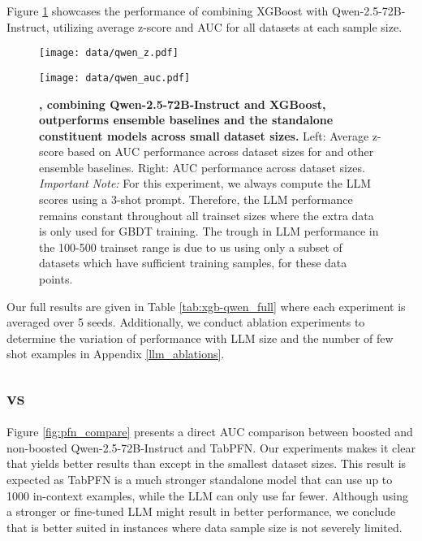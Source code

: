 Figure \ref{fig:qwen} showcases the performance of \methodname combining XGBoost with Qwen-2.5-72B-Instruct, utilizing average z-score and AUC for all datasets at each sample size.

\begin{figure}
    \centering
    \begin{minipage}{0.49\linewidth}
        \centering
        \texttt{[image: data/qwen\_z.pdf]}
    \end{minipage}
    \hfill
    \begin{minipage}{0.49\linewidth}
        \centering
        \texttt{[image: data/qwen\_auc.pdf]}
    \end{minipage}
    \caption{\textbf{\methodname, combining Qwen-2.5-72B-Instruct and XGBoost, outperforms ensemble baselines and the standalone constituent models across small dataset sizes.} Left: Average z-score based on AUC performance across dataset sizes for \methodname and other ensemble baselines. Right: AUC performance across dataset sizes. \textit{Important Note:} For this experiment, we always compute the LLM scores using a 3-shot prompt.  Therefore, the LLM performance remains constant throughout all trainset sizes where the extra data is only used for GBDT training. The trough in LLM performance in the 100-500 trainset range is due to us using only a subset of datasets which have sufficient training samples, for these data points.}
    \label{fig:qwen}
\end{figure}

Our full results are given in Table \ref{tab:xgb-qwen_full} where each experiment is averaged over 5 seeds. Additionally, we conduct ablation experiments to determine the variation of \methodname performance with LLM size and the number of few shot examples in Appendix \ref{llm_ablations}.

\subsection{\methodnamepfn vs \methodname}

Figure \ref{fig:pfn_compare} presents a direct AUC comparison between boosted and non-boosted Qwen-2.5-72B-Instruct and TabPFN. Our experiments makes it clear that \methodnamepfn yields better results than \methodname except in the smallest dataset sizes. This result is expected as TabPFN is a much stronger standalone model that can use up to 1000 in-context examples, while the LLM can only use far fewer. Although using a stronger or fine-tuned LLM might result in better performance, we conclude that \methodnamepfn is better suited in instances where data sample size is not severely limited.

